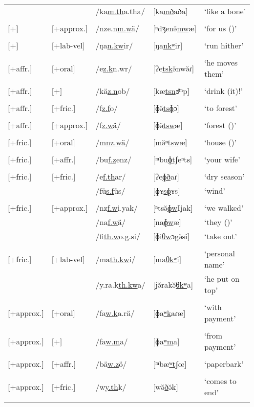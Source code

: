 \begin{longtable}{p{}p{}lll}
		&&/ka\uline{m.th}a.tha/&[ka\uline{mð}aða]&`like a bone'\\
		&&&&\\
		{[+\isi{nasal}]} &[+approx.]&/nze.n\uline{m.w}ä/&[ⁿdʒenə̆\uline{mw}æ]&`for us (\Emph)'\\
		&&&&\\
		{[+\isi{nasal}]} &[+lab-vel]&/ŋa\uline{n.kw}ir/&[ŋa\uline{nkʷ}ir]&`run hither'\\
		&&&&\\
		{[+affr.]} &[+oral]&/e\uline{z.k}n.wr/&[ʔe\uline{tsk}ə̆nwə̆ɾ]&`he moves them'\\
		&&&&\\
		{[+affr.]} &[+\isi{nasal}]&/kä\uline{z.n}ob/&[kæ\uline{tsn}ɞ̆ᵐp]&`drink (it)!'\\
		&&&&\\
		{[+affr.]} &[+fric.]&/f\uline{z.f}o/&[ɸə̆\uline{tsɸ}ɔ]&`to forest'\\
		&&&&\\
		{[+affr.]} &[+approx.]&/f\uline{z.w}ä/&[ɸə̆\uline{tsw}æ]&`forest (\Emph)'\\
		&&&&\\
		{[+fric.]} &[+oral]&/m\uline{nz.w}ä/&[mə̆\uline{ⁿtsw}æ]&`house (\Emph)'\\
		&&&&\\
		{[+fric.]} &[+affr.]&/bu\uline{f.z}enz/&[ᵐbu\uline{ɸtʃ}eⁿts]&`your wife'\\
		&&&&\\
		{[+fric.]} &[+fric.]&/e\uline{f.th}ar/&[ʔe\uline{ɸð}aɾ]&`dry season'\\
		&&/fü\uline{s.f}üs/&[ɸʏ\uline{sɸ}ʏs]&`wind'\\
		&&&&\\
		{[+fric.]} &[+approx.]&/nz\uline{f.w}i.yak/&[ⁿtsə̆\uline{ɸw}Ijak]&`we walked'\\
		&&/na\uline{f.w}ä/&[na\uline{ɸw}æ]&`they (\Emph{})'\\
		&&/fi\uline{th.w}o.g.si/&[ɸi\uline{θw}ɔ{\ᵑ}gə̆si]&`take out'\\
		&&&&\\
		{[+fric.]} &[+lab-vel]&/ma\uline{th.kw}i/&[ma\uline{θkʷ}i]&`personal name'\\
		&&/y.ra.k\uline{th.kw}a/&[jə̆rakə̆\uline{θkʷ}a]&`he put on top'\\
		&&&&\\
		{[+approx.]} &[+oral]&/fa\uline{w.k}a.rä/&[ɸa\uline{ʷk}aɾæ]&`with payment'\\
		&&&&\\
		{[+approx.]} &[+\isi{nasal}]&/fa\uline{w.m}a/&[ɸa\uline{ʷm}a]&`from payment'\\
		&&&&\\
		{[+approx.]} &[+affr.]&/bä\uline{w.z}ö/&[ᵐbæ\uline{ʷtʃ}œ]&`paperbark'\\
		&&&&\\
		{[+approx.]} &[+fric.]&/w\uline{y.th}k/&[wə̆\uline{\super{j}ð}ə̆k]&`comes to end'\\
		\lspbottomrule 
\end{longtable} 

